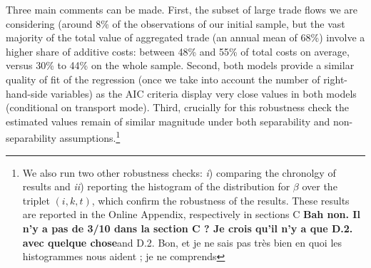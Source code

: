 \documentclass[a4paper,11pt]{article}
\begin{document}

Three main comments can be made. First, the subset of large trade flows we are considering (around 8\% of the observations of our initial sample, but the vast majority of the total value of aggregated trade (an annual mean of 68\%) involve a higher share of additive costs: between 48\% and 55\% of total costs on average, versus 30\% to 44\% on the whole sample.
Second, both models provide a similar quality of fit of the regression (once we take into account the number of right-hand-side variables) as the AIC criteria display very close values in both models (conditional on transport mode). Third, crucially for this robustness check the estimated values remain of similar magnitude under both separability and non-separability assumptions.\footnote{We also run two other robustness checks: \textit{i}) comparing the chronolgy of results and \textit{ii}) reporting the histogram of the distribution for $\beta$ over the triplet $(i,k,t)$, which confirm the robustness of the results. These results are reported in the Online Appendix, respectively in sections C \textbf{Bah non. Il n’y a pas de 3/10 dans la section C ? Je crois qu’il n’y a que D.2. avec quelque chose}and D.2. Bon, et je ne sais pas très bien en quoi les histogrammes nous aident ; je ne comprends } %
\end{document}
